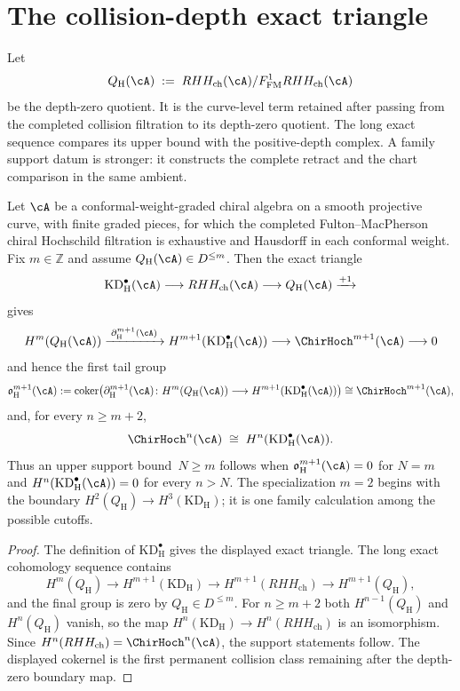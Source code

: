 \section{The collision-depth exact triangle}
\label{sec:theorem-h-off-koszul}

Let
\[
 Q_{\mathrm H}(\cA)
 \;:=\;
 RHH_{\mathrm{ch}}(\cA)/
 F^1_{\mathrm{FM}}RHH_{\mathrm{ch}}(\cA)
\]
be the depth-zero quotient.  It is the curve-level term retained after
passing from the completed collision filtration to its depth-zero
quotient.  The long exact sequence compares its upper bound with the
positive-depth complex.  A family support datum is stronger: it
constructs the complete retract and the chart comparison in the same
ambient.

\begin{theorem}
\label{thm:theorem-h-off-koszul-explicit-correction}
Let $\cA$ be a conformal-weight-graded chiral algebra on a smooth
projective curve, with finite graded pieces, for which the completed
Fulton--MacPherson chiral Hochschild filtration is exhaustive and
Hausdorff in each conformal weight.  Fix $m\in\mathbb Z$ and assume
$Q_{\mathrm H}(\cA)\in D^{\leq m}$.  Then the exact triangle
\[
 \mathrm{KD}_{\mathrm H}^{\bullet}(\cA)
 \longrightarrow
 RHH_{\mathrm{ch}}(\cA)
 \longrightarrow
 Q_{\mathrm H}(\cA)
 \xrightarrow{+1}
\]
gives
\[
 H^m(Q_{\mathrm H}(\cA))
 \xrightarrow{\;\partial_{\mathrm H}^{m+1}(\cA)\;}
 H^{m+1}(\mathrm{KD}_{\mathrm H}^{\bullet}(\cA))
 \longrightarrow
 \ChirHoch^{m+1}(\cA)
 \longrightarrow 0
\]
and hence the first tail group
\[
 \mathfrak{o}_{\mathrm H}^{m+1}(\cA)
 :=
 \operatorname{coker}\!\left(
  \partial_{\mathrm H}^{m+1}(\cA)\colon
  H^m(Q_{\mathrm H}(\cA))
  \longrightarrow
  H^{m+1}(\mathrm{KD}_{\mathrm H}^{\bullet}(\cA))
 \right)
 \cong
 \ChirHoch^{m+1}(\cA),
\]
and, for every $n\geq m+2$,
\[
 \ChirHoch^n(\cA)
 \;\cong\;
 H^n(\mathrm{KD}_{\mathrm H}^{\bullet}(\cA)).
\]
Thus an upper support bound~$N\geq m$ follows when
$\mathfrak{o}_{\mathrm H}^{m+1}(\cA)=0$ for $N=m$ and
$H^n(\mathrm{KD}_{\mathrm H}^{\bullet}(\cA))=0$ for every $n>N$.
The specialization $m=2$ begins with the boundary
$H^2(Q_{\mathrm H})\to H^3(\mathrm{KD}_{\mathrm H})$; it is one
family calculation among the possible cutoffs.
\end{theorem}

\begin{proof}
The definition of $\mathrm{KD}_{\mathrm H}^{\bullet}$ gives the
displayed exact triangle. The long exact cohomology sequence contains
\[
H^m(Q_{\mathrm H})\to H^{m+1}(\mathrm{KD}_{\mathrm H})
\to H^{m+1}(RHH_{\mathrm{ch}})\to H^{m+1}(Q_{\mathrm H}),
\]
and the final group is zero by $Q_{\mathrm H}\in D^{\leq m}$.
For $n\geq m+2$ both $H^{n-1}(Q_{\mathrm H})$ and
$H^n(Q_{\mathrm H})$
vanish, so the map
$H^n(\mathrm{KD}_{\mathrm H})\to H^n(RHH_{\mathrm{ch}})$ is an
isomorphism. Since
$H^n(RHH_{\mathrm{ch}})=\ChirHoch^n(\cA)$, the support statements
follow.  The displayed cokernel is the first permanent collision
class remaining after the depth-zero boundary map.
\end{proof}

